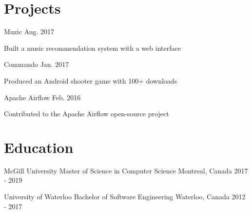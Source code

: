 \documentclass[12pt]{simple-resume}
\begin{document}
\section{Projects}
\begin{entry}
      {Muzic}
      {}
      {Aug. 2017}
      {}%
    \begin{entryItems}
        \item {Built a music recommendation system with a web interface}
    \end{entryItems}
\end{entry}
%
\begin{entry}
      {Commando}
      {}
      {}
      {Jan. 2017}%
    \begin{entryItems}
        \item {Produced an Android shooter game with 100+ downloads}
    \end{entryItems}
\end{entry}
%
\begin{entry}
    {Apache Airflow}
    {} 
    {}
    {Feb. 2016}%
    \begin{entryItems}%
        \item {Contributed to the Apache Airflow open-source project}
    \end{entryItems}
\end{entry}
%
\section{Education}
\begin{entry}
    {McGill University}
    {Master of Science in Computer Science}
    {Montreal, Canada}
    {2017 - 2019}%
\end{entry}
\begin{entry}
    {University of Waterloo}
    {Bachelor of Software Engineering}
    {Waterloo, Canada}
    {2012 - 2017}%
\end{entry}
\end{document}
